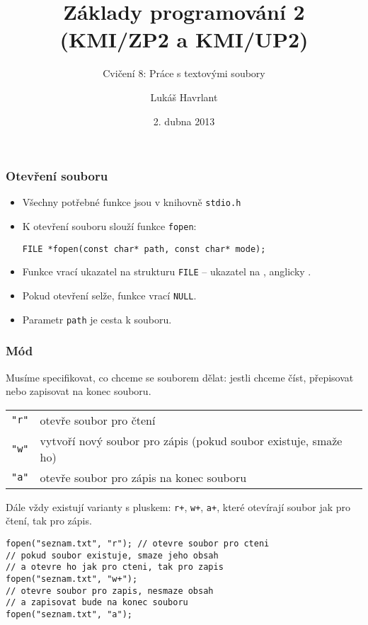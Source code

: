 \documentclass{beamer}
\title{Základy programování 2 (KMI/ZP2 a KMI/UP2)}
\subtitle{Cvičení 8: Práce s textovými soubory}
\author{Lukáš Havrlant}
\date{2. dubna 2013}
\institute{Univerzita Palackého}
\newenvironment{itemizex}%
  {\large \begin{itemize}%
    \setlength{\itemsep}{8pt}%
    \setlength{\parskip}{8pt}}%
  {\end{itemize}}
\begin{document}
\begin{frame}[t,plain]
\titlepage
\end{frame}


\begin{frame}[t,fragile]\frametitle{Otevření souboru} 
    \begin{itemizex}
        \item Všechny potřebné funkce jsou v knihovně \texttt{stdio.h}
        \item K otevření souboru slouží funkce \texttt{fopen}:
\begin{verbatim} 
FILE *fopen(const char* path, const char* mode);
\end{verbatim}
        \item Funkce vrací ukazatel na strukturu \texttt{FILE} -- ukazatel na , anglicky .
        \item Pokud otevření selže, funkce vrací \texttt{NULL}.
        \item Parametr \texttt{path} je cesta k souboru.
    \end{itemizex}
\end{frame}


\begin{frame}[t,fragile]\frametitle{Mód} 
Musíme specifikovat, co chceme se souborem dělat: jestli chceme číst, přepisovat nebo zapisovat na konec souboru. 

\begin{tabular}{cl}
\texttt{"r"} & otevře soubor pro čtení\\
\texttt{"w"} & vytvoří nový soubor pro zápis (pokud soubor existuje, smaže ho)\\
\texttt{"a"} & otevře soubor pro zápis na konec souboru\\
\end{tabular}

Dále vždy existují varianty s pluskem: \texttt{r+}, \texttt{w+}, \texttt{a+}, které otevírají soubor jak pro čtení, tak pro zápis. 

\begin{verbatim} 
fopen("seznam.txt", "r"); // otevre soubor pro cteni
// pokud soubor existuje, smaze jeho obsah
// a otevre ho jak pro cteni, tak pro zapis
fopen("seznam.txt", "w+"); 
// otevre soubor pro zapis, nesmaze obsah
// a zapisovat bude na konec souboru
fopen("seznam.txt", "a"); 
\end{verbatim}
\end{frame}
\end{document}

